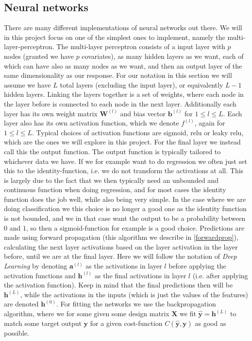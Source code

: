 \documentclass{article}
\begin{document}
\subsection{Neural networks}
There are many different implementations of neural networks out there. We will
in this project focus on one of the simplest ones to implement, namely the
multi-layer-perceptron. The multi-layer perceptron consists of a input layer
with $p$ nodes (granted we have $p$ covariates), as many hidden layers as we
want, each of which can have also as many nodes as we want, and then an output
layer of the same dimensionality as our response. For our notation in this
section we will assume we have $L$ total layers (excluding the input layer), or
equivalently $L-1$ hidden layers. Linking the layers together is a set of
weights, where each node in the layer before is connected to each node in the
next layer. Additionally each layer has its own weight matrix $\bm{W}^{(l)}$ and bias
vector $\bm{b}^{(l)}$ for $1 \leq l \leq L$. Each layer also has its own
activation function, which we denote $f^{(l)}$, again for $1 \leq l \leq
      L$. Typical choices of activation functions are sigmoid, relu or leaky relu,
which are the ones we will explore in this project. For the final layer we
instead call this the output function. The output function is typically tailored
to whichever data we have. If we for example want to do regression we often just
set this to the identity-function, i.e. we do not transform the activations at
all. This is largely due to the fact that we then typically need an unbounded
and continuous function when doing regression, and for most cases the identity
function does the job well, while also being very simple. In the case where we
are doing classification we this choice is no longer a good one as the identity
function is not bounded, and we in that case want the output to be a probability
between $0$ and $1$, so then a sigmoid-function for example is a good choice.
Predictions are made using forward propagation (this algorithm we describe in
\ref{forwardprop}), calculating the next layer activations based on the layer
activation in the layer before, until we are at the final layer. Here we will
follow the notation of \textit{Deep Learning}\cite{goodfellow2016deep} by
denoting $\bm{a}^{(l)}$ as the activations in layer $l$ before applying the
activation functions and $\bm{h}^{(l)}$ as the final activations in layer $l$
(i.e. after applying the activation function).  Keep in mind that the final
predictions then will be $\bm{h}^{(L)}$, while the activations in the inputs
(which is just the values of the features) are denoted $\bm{h}^{(0)}$. For
fitting the networks we use the backpropagation algorithm, where we for some
given some design matrix $\bm{X}$ we fit $\hat{\bm{y}} = \bm{h}^{(L)}$ to match
some target output $\bm{y}$ for a given cost-function $C(\hat{\bm{y}}, \bm{y})$
as good as possible.
\end{document}
